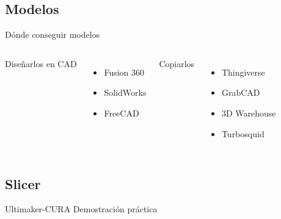 \documentclass{beamer}
\begin{document}
	\subsection{Modelos}
	\begin{frame}{Dónde conseguir modelos}
		\begin{columns}[T, onlytextwidth]
			Diseñarlos en CAD
			\begin{itemize}
				\item Fusion 360
				\item SolidWorks
				\item FreeCAD
			\end{itemize}
			Copiarlos
			\begin{itemize}
				\item Thingiverse
				\item GrabCAD
				\item 3D Warehouse
				\item Turbosquid
			\end{itemize}
		\end{columns}
	\end{frame}
	
	\subsection{Slicer}
	\begin{frame}[standout]{Ultimaker-CURA}
		Demostración práctica
	\end{frame}
	
\end{document}

